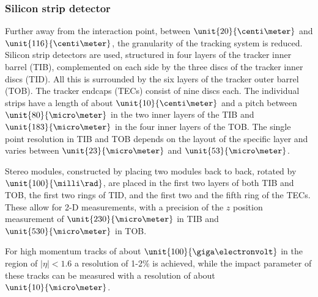 \subsubsection*{Silicon strip detector}
Further away from the interaction point, between $\unit{20}{\centi\meter}$ and $\unit{116}{\centi\meter}$, the granularity of the tracking system is reduced. Silicon strip detectors are used, structured in four layers of the tracker inner barrel (TIB), complemented on each side by the three discs of the tracker inner discs (TID). All this is surrounded by the six layers of the tracker outer barrel (TOB). The tracker endcaps (TECs) consist of nine discs each. The individual strips have a length of about $\unit{10}{\centi\meter}$ and a pitch between $\unit{80}{\micro\meter}$ in the two inner layers of the TIB and $\unit{183}{\micro\meter}$ in the four inner layers of the TOB. The single point resolution in TIB and TOB depends on the layout of the specific layer and varies between $\unit{23}{\micro\meter}$ and $\unit{53}{\micro\meter}$. 

Stereo modules, constructed by placing two modules back to back, rotated by $\unit{100}{\milli\rad}$, are placed in the first two layers of both TIB and TOB, the first two rings of TID, and the first two and the fifth ring of the TECs. These allow for 2-D measurements, with a precision of the $z$ position measurement of $\unit{230}{\micro\meter}$ in TIB and $\unit{530}{\micro\meter}$ in TOB. 

For high momentum tracks of about $\unit{100}{\giga\electronvolt}$ in the region of $\vert \eta \vert < 1.6$ a \pt resolution of 1-2\% is achieved, while the impact parameter of these tracks can be measured with a resolution of about $\unit{10}{\micro\meter}$. 

